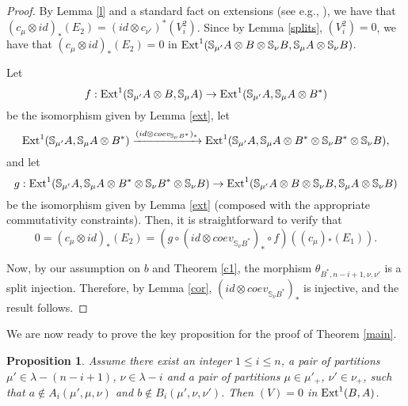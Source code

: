 \documentclass{amsart}
\newtheorem{proposition}[theorem]{Proposition}
\theoremstyle{definition}
\newcommand{\Ext}{\text{\rm Ext}^1}
\newcommand{\ot}{\otimes}
\begin{document}
\begin{proof}
By Lemma \ref{l} and a standard fact on extensions (see e.g.,
\cite{m}), we have that $(c_{\mu}\ot id)_*(E_2)=(id\ot
c_{\nu'})^*(V_{i}^2)$. Since by Lemma \ref{splits}, $(V_{i}^2)=0$,
we have that $(c_{\mu}\ot id)_*(E_2)=0$ in
$\Ext(\mathbb{S}_{\mu'}A\ot B\ot
\mathbb{S}_{\nu}B,\mathbb{S}_{\mu}A\ot \mathbb{S}_{\nu}B)$.

Let
$$f:\Ext(\mathbb{S}_{\mu'}A\ot B,\mathbb{S}_{\mu}A)\to
\Ext(\mathbb{S}_{\mu'}A,\mathbb{S}_{\mu}A\ot B^*)$$ be the
isomorphism given by Lemma \ref{ext}, let
\begin{equation*}
\Ext(\mathbb{S}_{\mu'}A,\mathbb{S}_{\mu}A\ot B^*)\xrightarrow{(id\ot
coev_{\mathbb{S}_{\nu}B^*})_*}
\Ext(\mathbb{S}_{\mu'}A,\mathbb{S}_{\mu}A\ot B^*\ot
\mathbb{S}_{\nu}B^*\ot \mathbb{S}_{\nu}B),
\end{equation*}
and let
$$g:\Ext(\mathbb{S}_{\mu'}A,\mathbb{S}_{\mu}A\ot B^*\ot
\mathbb{S}_{\nu}B^*\ot \mathbb{S}_{\nu}B)\to
\Ext(\mathbb{S}_{\mu'}A\ot B\ot
\mathbb{S}_{\nu}B,\mathbb{S}_{\mu}A\ot \mathbb{S}_{\nu}B)$$ be the
isomorphism given by Lemma \ref{ext} (composed with the appropriate
commutativity constraints). Then, it is straightforward to verify
that
$$0=(c_{\mu}\ot id)_*(E_2)=\left(g\circ (id\ot
coev_{\mathbb{S}_{\nu}B^*})_*\circ f\right)((c_{\mu}){_*}(E_1)).$$

Now, by our assumption on $b$ and Theorem \ref{c1}, the morphism
$\theta_{B^*,n-i+1,\nu,\nu'}$ is a split injection. Therefore, by
Lemma \ref{cor}, $(id\ot coev_{\mathbb{S}_{\nu}B^*})_*$ is
injective, and the result follows.
\end{proof}

We are now ready to prove the key proposition for the proof of
Theorem \ref{main}.
\begin{proposition}\label{mainp}
Assume there exist an integer $1\le i\le n$, a pair of partitions
$\mu'\in \lambda-(n-i+1)$, $\nu\in \lambda-i$ and a pair of
partitions $\mu\in \mu'_+$, $\nu'\in \nu_+$, such that $a\notin
A_i(\mu',\mu,\nu)$ and $b\notin B_i(\mu',\nu,\nu')$. Then $(V)=0$ in
$\Ext(B,A)$.
\end{proposition}
\end{document}
